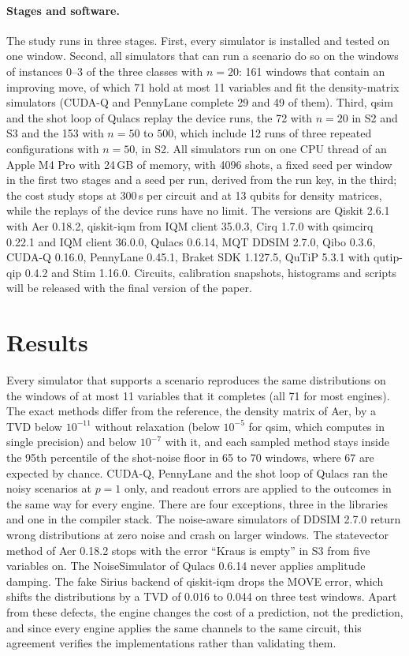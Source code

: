 \documentclass{scspaperproc}
\begin{document}
\paragraph{Stages and software.}
The study runs in three stages. First, every simulator is installed and tested
on one window. Second, all simulators that can run a scenario do so on the
windows of instances 0--3 of the three classes with $n = 20$: 161 windows that
contain an improving move, of which 71 hold at most 11 variables and fit the
density-matrix simulators (CUDA-Q and PennyLane complete 29 and 49 of them).
Third, qsim and the shot loop of Qulacs replay the device runs, the 72 with
$n = 20$ in S2 and S3 and the 153 with $n = 50$ to $500$, which include 12
runs of three repeated configurations with $n = 50$, in S2. All
simulators run on one CPU thread of an Apple M4 Pro with 24\,GB of memory,
with 4096 shots, a fixed seed per window in the first two stages and a seed
per run, derived from the run key, in the third; the cost study stops at 300\,s
per circuit and at 13 qubits for density matrices, while the replays of the
device runs have no limit. The versions are Qiskit 2.6.1 with Aer 0.18.2,
qiskit-iqm from IQM client 35.0.3, Cirq 1.7.0 with qsimcirq 0.22.1 and IQM
client 36.0.0, Qulacs 0.6.14, MQT DDSIM 2.7.0, Qibo 0.3.6, CUDA-Q 0.16.0,
PennyLane 0.45.1, Braket SDK 1.127.5, QuTiP 5.3.1 with qutip-qip 0.4.2 and
Stim 1.16.0. Circuits, calibration snapshots, histograms and scripts will be
released with the final version of the paper.

\section{Results}

Every simulator that supports a scenario reproduces the same distributions on
the windows of at most 11 variables that it completes (all 71 for most
engines). The exact methods differ from the
reference, the density matrix of Aer, by a TVD below $10^{-11}$ without
relaxation (below $10^{-5}$ for qsim, which computes in single precision) and
below $10^{-7}$ with it, and each sampled method stays inside the 95th
percentile of the shot-noise floor in 65 to 70 windows, where 67 are expected
by chance. CUDA-Q, PennyLane and the shot loop of Qulacs ran the noisy
scenarios at $p = 1$ only, and readout errors are applied to the outcomes in
the same way for every engine. There are four exceptions, three in the
libraries and one in the compiler stack. The noise-aware simulators of DDSIM
2.7.0 return wrong distributions at zero noise and crash on larger windows. The statevector method of Aer 0.18.2 stops
with the error ``Kraus is empty'' in S3 from five variables on. The
NoiseSimulator of Qulacs 0.6.14 never applies amplitude damping. The fake
Sirius backend of qiskit-iqm drops the MOVE error, which shifts the
distributions by a TVD of 0.016 to 0.044 on three test windows. Apart from these defects, the engine changes the cost of a
prediction, not the prediction, and since every engine applies the same
channels to the same circuit, this agreement verifies the implementations
rather than validating them.
\end{document}
